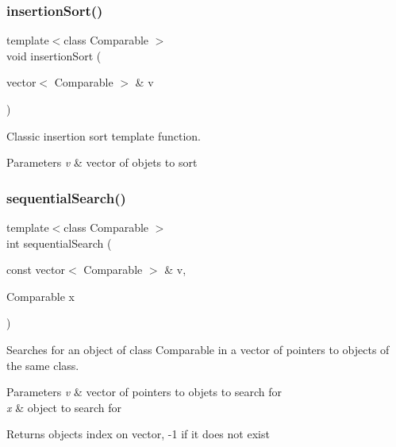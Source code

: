 \subsubsection{\texorpdfstring{insertion\+Sort()}{insertionSort()}}
{\footnotesize\ttfamily template$<$class Comparable $>$ \\
void insertion\+Sort (\begin{DoxyParamCaption}\item[{vector$<$ Comparable $>$ \&}]{v }\end{DoxyParamCaption})}



Classic insertion sort template function. 


\begin{DoxyParams}{Parameters}
{\em v} & vector of objets to sort \\
\hline
\end{DoxyParams}
\mbox{\label{group___template_gacd555ad1f1fc3b2011aab63641f98151}} 
\subsubsection{\texorpdfstring{sequential\+Search()}{sequentialSearch()}}
{\footnotesize\ttfamily template$<$class Comparable $>$ \\
int sequential\+Search (\begin{DoxyParamCaption}\item[{const vector$<$ Comparable $>$ \&}]{v,  }\item[{Comparable}]{x }\end{DoxyParamCaption})}



Searches for an object of class Comparable in a vector of pointers to objects of the same class. 


\begin{DoxyParams}{Parameters}
{\em v} & vector of pointers to objets to search for \\
\hline
{\em x} & object to search for\\
\hline
\end{DoxyParams}
\begin{DoxyReturn}{Returns}
object\textquotesingle{}s index on vector, -\/1 if it does not exist 
\end{DoxyReturn}
\mbox{\label{group___template_gada542f6ca0126d949ac4f038116a57dd}} 

